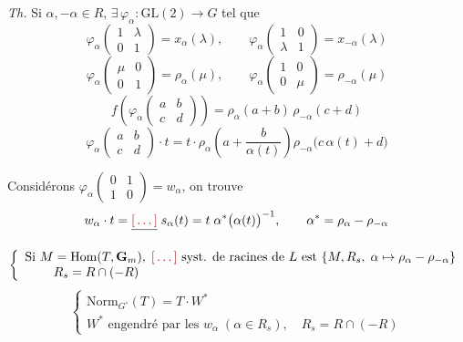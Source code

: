 \documentclass[11pt,a4paper]{article}
\begin{document}
\emph{Th.} Si $\alpha, -\alpha \in R$, $\exists\, \varphi_\alpha :
\mathrm{GL}(2) \longrightarrow G$ tel que
\[
  \varphi_\alpha \begin{pmatrix} 1 & \lambda \\ 0 & 1 \end{pmatrix}
    = x_\alpha(\lambda), \qquad
  \varphi_\alpha \begin{pmatrix} 1 & 0 \\ \lambda & 1 \end{pmatrix}
    = x_{-\alpha}(\lambda)
\]
\[
  \varphi_\alpha \begin{pmatrix} \mu & 0 \\ 0 & 1 \end{pmatrix}
    = \rho_\alpha(\mu), \qquad
  \varphi_\alpha \begin{pmatrix} 1 & 0 \\ 0 & \mu \end{pmatrix}
    = \rho_{-\alpha}(\mu)
\]
\[
  f\left(\varphi_\alpha \begin{pmatrix} a & b \\ c & d \end{pmatrix}\right)
    = \rho_\alpha(a+b)\,\rho_{-\alpha}(c+d)
\]
\[
  \varphi_\alpha \begin{pmatrix} a & b \\ c & d \end{pmatrix} \cdot t
    = t \cdot \rho_\alpha\!\left(a + \frac{b}{\alpha(t)}\right)
      \rho_{-\alpha}\bigl(c\,\alpha(t) + d\bigr)
\]

 Considérons $\varphi_\alpha \begin{pmatrix} 0 & 1 \\ 1 & 0
\end{pmatrix} = w_\alpha$, on trouve
\[
  w_\alpha \cdot t = \struck{\ill{}} \; s_\alpha(t)
    = t\;\alpha^{*}\bigl(\alpha(t)\bigr)^{-1}, \qquad
  \alpha^{*} = \rho_\alpha - \rho_{-\alpha}
\]

\[
  \left\{
  \begin{array}{l}
    \text{Si } M = \mathrm{Hom}(T, \mathbf{G}_m), \; \ill{} \text{ syst. de
      racines de } L \text{ est } \{M, R_s, \; \alpha \mapsto \rho_\alpha -
      \rho_{-\alpha}\} \\
    \phantom{\text{Si } M} R_s = R \cap (-R)
  \end{array}
  \right.
\]
\[
  \left\{
  \begin{array}{l}
    \mathrm{Norm}_{G^{\circ}}(T) = T \cdot W^{*} \\
    W^{*} \text{ engendré par les } w_\alpha \; (\alpha \in R_s), \quad
      R_s = R \cap (-R)
  \end{array}
  \right.
\]
\end{document}
